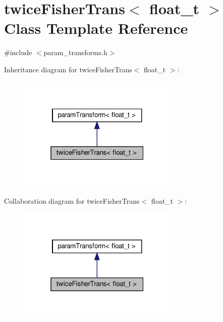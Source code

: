 \hypertarget{classtwiceFisherTrans}{}\section{twice\+Fisher\+Trans$<$ float\+\_\+t $>$ Class Template Reference}
\label{classtwiceFisherTrans}


{\ttfamily \#include $<$param\+\_\+transforms.\+h$>$}



Inheritance diagram for twice\+Fisher\+Trans$<$ float\+\_\+t $>$\+:\nopagebreak
\begin{figure}[H]
\begin{center}
\leavevmode
\includegraphics[width=217pt]{classtwiceFisherTrans__inherit__graph}
\end{center}
\end{figure}


Collaboration diagram for twice\+Fisher\+Trans$<$ float\+\_\+t $>$\+:\nopagebreak
\begin{figure}[H]
\begin{center}
\leavevmode
\includegraphics[width=217pt]{classtwiceFisherTrans__coll__graph}
\end{center}
\end{figure}
